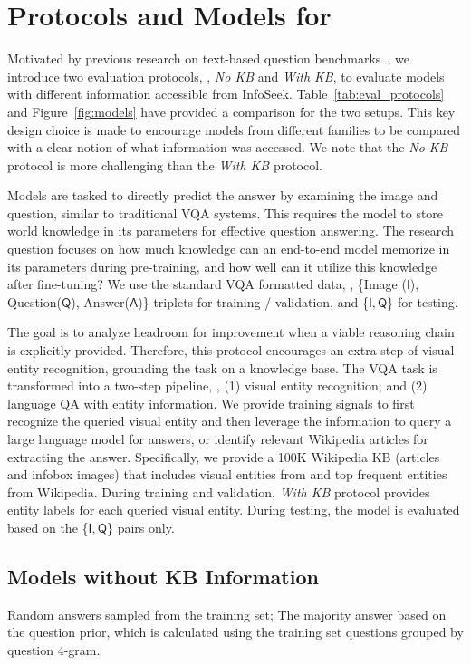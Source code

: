 \documentclass[11pt]{article}
\begin{document}
\section{Protocols and Models for {\infoseek}}
\label{sec:method}
Motivated by previous research on text-based question benchmarks~\cite{joshi-etal-2017-triviaqa,roberts2020much}, we introduce two evaluation protocols, \ie, \emph{No KB} and \emph{With KB}, to evaluate models with different information accessible from {\sc InfoSeek}.
Table~\ref{tab:eval_protocols} and Figure~\ref{fig:models} have provided a comparison for the two setups.
This key design choice is made to encourage models from different families to be compared with a clear notion of what information was accessed. We note that the \emph{No KB} protocol is more challenging than the \emph{With KB} protocol.

 Models are tasked to directly predict the answer by examining the image and question, similar to traditional VQA systems. 
This requires the model to store world knowledge in its parameters for effective question answering. The research question focuses on how much knowledge can an end-to-end model memorize in its parameters during pre-training, and how well can it utilize this knowledge after fine-tuning? 
We use the standard VQA formatted data, \ie, \{Image ($\mathsf{I}$), Question($\mathsf{Q}$), Answer($\mathsf{A}$)\} triplets for training / validation, and \{$\mathsf{I}, \mathsf{Q}$\} for testing. 


 The goal is to analyze headroom for improvement when a viable reasoning chain is explicitly provided.
Therefore, this protocol encourages an extra step of visual entity recognition, grounding the task on a knowledge base.
The VQA task is transformed into a two-step pipeline, \ie, (1) visual entity recognition; and (2) language QA with entity information. 
We provide training signals to first recognize the queried visual entity and then leverage the information to query a large language model for answers, or identify relevant Wikipedia articles for extracting the answer. 
Specifically, we provide a 100K Wikipedia KB (articles and infobox images) that includes visual entities from \ourdataset and top frequent entities from Wikipedia.
During training and validation, \emph{With KB} protocol provides entity labels for each queried visual entity. 
During testing, the model is evaluated based on the \{$\mathsf{I}, \mathsf{Q}$\} pairs only.

\subsection{Models without KB Information}
\label{subsec:e2e_models}
 Random answers sampled from the training set; The majority answer based on the question prior, which is calculated using the training set questions grouped by question 4-gram.
\end{document}
